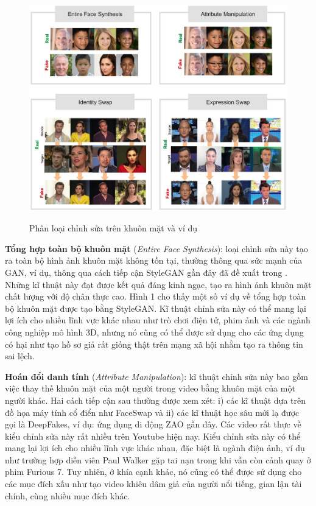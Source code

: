 \documentclass{article}
\begin{document}
\begin{figure}[h!]
\caption{Phân loại chỉnh sửa trên khuôn mặt và ví dụ}
\includegraphics[width=\columnwidth]{fig-1-category-and-example}
\label{fig-1-category-and-example}
\end{figure}

\textbf{Tổng hợp toàn bộ khuôn mặt} (\textit{Entire Face Synthesis}): loại chỉnh sửa này tạo ra toàn bộ hình ảnh khuôn mặt không tồn tại, thường thông qua sức mạnh của GAN, ví dụ, thông qua cách tiếp cận StyleGAN gần đây đã đề xuất trong . Những kĩ thuật này đạt được kết quả đáng kinh ngạc, tạo ra hình ảnh khuôn mặt chất lượng với độ chân thực cao. Hình 1 cho thấy một số ví dụ về tổng hợp toàn bộ khuôn mặt được tạo bằng StyleGAN. Kĩ thuật chỉnh sửa này có thể mang lại lợi ích cho nhiều lĩnh vực khác nhau như trò chơi điện tử, phim ảnh và các ngành công nghiệp mô hình 3D, nhưng nó cũng có thể được sử dụng cho các ứng dụng có hại như tạo hồ sơ giả rất giống thật trên mạng xã hội nhằm tạo ra thông tin sai lệch.

\textbf{Hoán đổi danh tính} (\textit{Attribute Manipulation}): kĩ thuật chỉnh sửa này bao gồm việc thay thế khuôn mặt của một người trong video bằng khuôn mặt của một người khác. Hai cách tiếp cận sau thường được xem xét: i) các kĩ thuật dựa trên đồ họa máy tính cổ điển như FaceSwap và ii) các kĩ thuật học sâu mới lạ được gọi là DeepFakes, ví dụ: ứng dụng di động ZAO gần đây. Các video rất thực về kiểu chỉnh sửa này rất nhiều trên Youtube hiện nay. Kiểu chỉnh sửa này có thể mang lại lợi ích cho nhiều lĩnh vực khác nhau, đặc biệt là ngành điện ảnh, ví dụ như trường hợp diễn viên Paul Walker gặp tai nạn trong khi vẫn còn cảnh quay ở phim Furious 7. Tuy nhiên, ở khía cạnh khác, nó cũng có thể được sử dụng cho các mục đích xấu như tạo video khiêu dâm giả của người nổi tiếng, gian lận tài chính, cùng nhiều mục đích khác.
\end{document}
